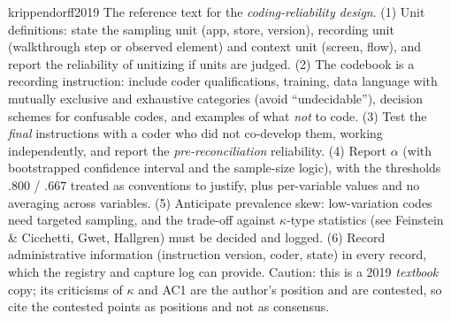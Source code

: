\begin{papercard}{krippendorff2019}
 The reference text for the \emph{coding-reliability design}. (1) Unit definitions: state the sampling unit (app, store, version), recording unit (walkthrough step or observed element) and context unit (screen, flow), and report the reliability of unitizing if units are judged. (2) The codebook is a recording instruction: include coder qualifications, training, data language with mutually exclusive and exhaustive categories (avoid ``undecidable''), decision schemes for confusable codes, and examples of what \emph{not} to code. (3) Test the \emph{final} instructions with a coder who did not co-develop them, working independently, and report the \emph{pre-reconciliation} reliability. (4) Report $\alpha$ (with bootstrapped confidence interval and the sample-size logic), with the thresholds $.800$ / $.667$ treated as conventions to justify, plus per-variable values and no averaging across variables. (5) Anticipate prevalence skew: low-variation codes need targeted sampling, and the trade-off against $\kappa$-type statistics (see Feinstein \& Cicchetti, Gwet, Hallgren) must be decided and logged. (6) Record administrative information (instruction version, coder, state) in every record, which the registry and capture log can provide. Caution: this is a 2019 \emph{textbook} copy; its criticisms of $\kappa$ and AC1 are the author's position and are contested, so cite the contested points as positions and not as consensus.
\end{papercard}
